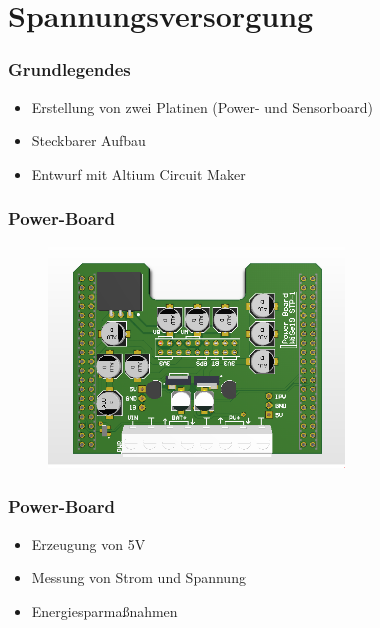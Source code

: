 \documentclass{beamer}
\begin{document}
\section{Spannungsversorgung}
\begin{frame}
\frametitle{Grundlegendes}
\begin{itemize}
    \item Erstellung von zwei Platinen (Power- und Sensorboard)
    \item Steckbarer Aufbau
    \item Entwurf mit Altium Circuit Maker
\end{itemize}

\end{frame}
\begin{frame}
\frametitle{Power-Board}
\begin{figure}[H]
\centering
\includegraphics[width=0.7\textwidth]{./img/PCB_Power_3D_top.PNG}
\end{figure}
\end{frame}

\begin{frame}
\frametitle{Power-Board}
\begin{itemize}
\item Erzeugung von 5V
\item Messung von Strom und Spannung
\item Energiesparmaßnahmen
\end{itemize}

\end{frame}
\end{document}
